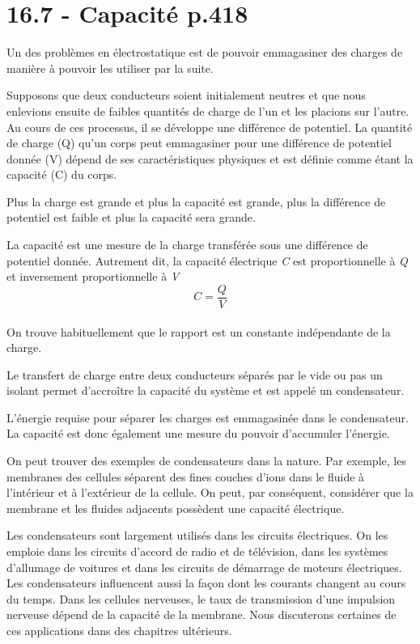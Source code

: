 \documentclass[../main.tex]{subfiles}
\begin{document}
\section{16.7 - Capacité p.418}

Un des problèmes en électrostatique est de pouvoir emmagasiner des charges de manière à pouvoir les utiliser par la suite.\\
\par Supposons que deux conducteurs soient initialement neutres et que nous enlevions ensuite de faibles quantités de charge de l'un et les placions sur l'autre. Au cours de ces processus, il se développe une différence de potentiel. La quantité de charge (Q) qu'un corps peut emmagasiner pour une différence de potentiel donnée (V) dépend de ses caractéristiques physiques et est définie comme étant la capacité (C) du corps.\\
\par Plus la charge est grande et plus la capacité est grande, plus la différence de potentiel est faible et plus la capacité sera grande.\\
\par La capacité est une mesure de la charge transférée sous une différence de potentiel donnée. Autrement dit, la capacité électrique \textit{C} est proportionnelle à \textit{Q} et inversement proportionnelle à \textit{V}\\
$$C = \frac{Q}{V}$$\\
On trouve habituellement que le rapport est un constante indépendante de la charge.\\
\par Le transfert de charge entre deux conducteurs séparés par le vide ou pas un isolant permet d'accroître la capacité du système et est appelé un condensateur.\\
\par L'énergie requise pour séparer les charges est emmagasinée dans le condensateur. La capacité est donc également une mesure du pouvoir d'accumuler l'énergie.\\
\par On peut trouver des exemples de condensateurs dans la nature. Par exemple, les membranes des cellules séparent des fines couches d'ions dans le fluide à l'intérieur et à l'extérieur de la cellule. On peut, par conséquent, considérer que la membrane et les fluides adjacents possèdent une capacité électrique.\\
\par Les condensateurs sont largement utilisés dans les circuits électriques. On les emploie dans les circuits d'accord de radio et de télévision, dans les systèmes d'allumage de voitures et dans les circuits de démarrage de moteurs électriques. Les condensateurs influencent aussi la façon dont les courants changent au cours du temps. Dans les cellules nerveuses, le taux de transmission d'une impulsion nerveuse dépend de la capacité de la membrane. Nous discuterons certaines de ces applications dans des chapitres ultérieurs.\\
\end{document}
